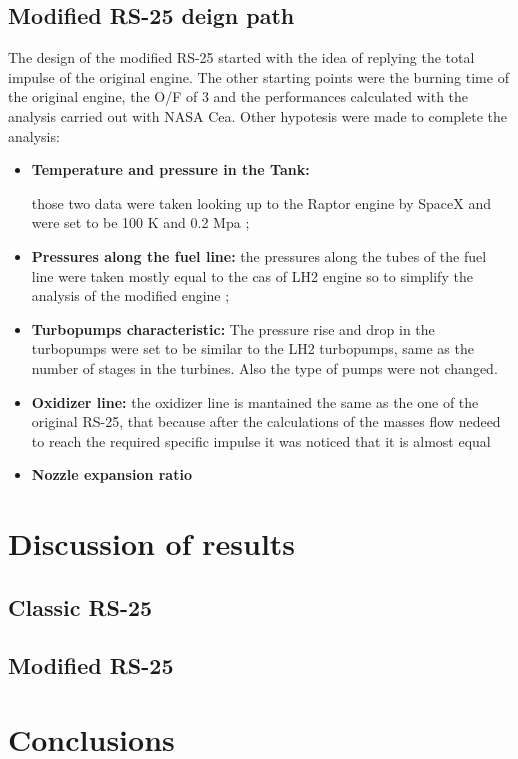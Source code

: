 \subsection{Modified RS-25 deign path}
The design of the modified RS-25 started with the idea of replying the total impulse of the original engine. The other starting points were the burning time of the original engine, the O/F of 3 and the performances calculated with the analysis carried out with NASA Cea. Other hypotesis  were made to complete the analysis:
\begin{itemize}
    \item\textbf{Temperature and pressure in the Tank:}

    those two data were taken looking up to the Raptor engine by SpaceX and were set to be 100 K and 0.2 Mpa ;

    \item\textbf{Pressures along the fuel line:} 
    the pressures along the tubes of the fuel line were taken mostly equal to the cas of LH2 engine so to simplify the analysis of the modified engine ;

    \item\textbf{Turbopumps characteristic:}
    The pressure rise and drop in the turbopumps were set to be similar to the LH2 turbopumps, same as the number of stages in the turbines. Also the type of pumps were not changed. 
    \item \textbf{Oxidizer line:}
    the oxidizer line is mantained the same as the one of the original RS-25, that because after the calculations of the masses flow nedeed to reach the required specific impulse it was noticed that it is almost equal 
    \item\textbf{Nozzle expansion ratio}
\end{itemize}
\section{Discussion of results}
\subsection{Classic RS-25}
\subsection{Modified RS-25}
\section{Conclusions}

 
